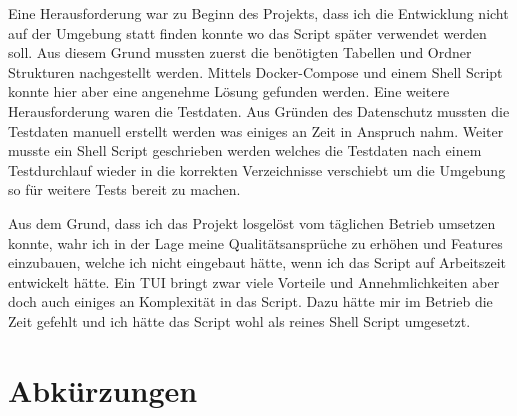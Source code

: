 \documentclass[a4paper,oneside, 12pt]{report}
\begin{document}
Eine Herausforderung war zu Beginn des Projekts, dass ich die Entwicklung nicht auf der Umgebung statt finden konnte wo das Script später verwendet werden soll. Aus diesem Grund mussten zuerst die benötigten Tabellen und Ordner Strukturen nachgestellt werden. Mittels Docker-Compose und einem Shell Script konnte hier aber eine angenehme Lösung gefunden werden. Eine weitere Herausforderung waren die Testdaten. Aus Gründen des Datenschutz mussten die Testdaten manuell erstellt werden was einiges an Zeit in Anspruch nahm. Weiter musste ein Shell Script geschrieben werden welches die Testdaten nach einem Testdurchlauf wieder in die korrekten Verzeichnisse verschiebt um die Umgebung so für weitere Tests bereit zu machen.

Aus dem Grund, dass ich das Projekt losgelöst vom täglichen Betrieb umsetzen konnte, wahr ich in der Lage meine Qualitätsansprüche zu erhöhen und Features einzubauen, welche ich nicht eingebaut hätte, wenn ich das Script auf Arbeitszeit entwickelt hätte. Ein \ac{TUI} bringt zwar viele Vorteile und Annehmlichkeiten aber doch auch einiges an Komplexität in das Script. Dazu hätte mir im Betrieb die Zeit gefehlt und ich hätte das Script wohl als reines Shell Script umgesetzt.


\cleardoublepage
{}
{}
\chapter*{Abkürzungen}
\begin{acronym}[Abkürzungen]
\end{acronym}
\end{document}

